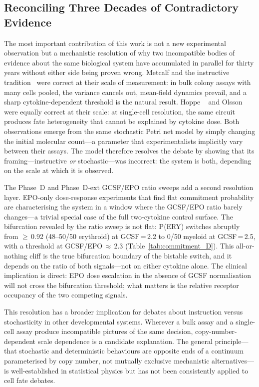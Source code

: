 
\subsection{Reconciling Three Decades of Contradictory Evidence}

The most important contribution of this work is not a new experimental observation but a mechanistic resolution of why two incompatible bodies of evidence about the same biological system have accumulated in parallel for thirty years without either side being proven wrong. Metcalf and the instructive tradition~\cite{metcalf1988} were correct at their scale of measurement: in bulk colony assays with many cells pooled, the variance cancels out, mean-field dynamics prevail, and a sharp cytokine-dependent threshold is the natural result. Hoppe \etal~\cite{hoppe2016} and Olsson \etal~\cite{olsson2016} were equally correct at their scale: at single-cell resolution, the same circuit produces fate heterogeneity that cannot be explained by cytokine dose. Both observations emerge from the same stochastic Petri net model by simply changing the initial molecular count---a parameter that experimentalists implicitly vary between their assays. The model therefore resolves the debate by showing that its framing---instructive \emph{or} stochastic---was incorrect: the system is both, depending on the scale at which it is observed.

The Phase~D and Phase~D-ext GCSF/EPO ratio sweeps add a second resolution layer. EPO-only dose-response experiments that find flat commitment probability are characterising the system in a window where the GCSF/EPO ratio barely changes---a trivial special case of the full two-cytokine control surface. The bifurcation revealed by the ratio sweep is not flat: P(ERY) switches abruptly from $\geq$\,0.92 (48--50/50 erythroid) at GCSF\,=\,2.2 to 0/50 myeloid at GCSF\,=\,2.5, with a threshold at GCSF/EPO\,$\approx$\,2.3 (Table~\ref{tab:commitment_D}). This all-or-nothing cliff is the true bifurcation boundary of the bistable switch, and it depends on the ratio of both signals---not on either cytokine alone. The clinical implication is direct: EPO dose escalation in the absence of GCSF normalisation will not cross the bifurcation threshold; what matters is the relative receptor occupancy of the two competing signals.

This resolution has a broader implication for debates about instruction versus stochasticity in other developmental systems. Wherever a bulk assay and a single-cell assay produce incompatible pictures of the same decision, copy-number-dependent scale dependence is a candidate explanation. The general principle---that stochastic and deterministic behaviours are opposite ends of a continuum parameterised by copy number, not mutually exclusive mechanistic alternatives---is well-established in statistical physics but has not been consistently applied to cell fate debates.

